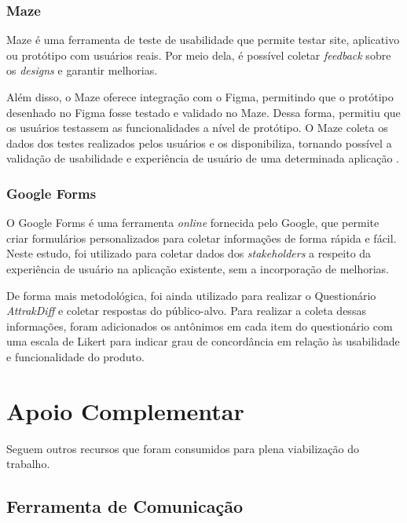 \subsubsection{Maze}
\label{sec:Maze}
Maze é uma ferramenta de teste de usabilidade que permite testar site, aplicativo ou protótipo com usuários reais. Por meio dela, é possível coletar \textit{feedback} sobre 
os \textit{designs} e garantir melhorias.

Além disso, o Maze oferece integração com o Figma, permitindo que o protótipo desenhado no Figma fosse testado e validado no Maze. Dessa forma, permitiu que os usuários 
testassem as funcionalidades a nível de protótipo. O Maze coleta os dados dos testes realizados pelos usuários e os disponibiliza, tornando possível a validação de usabilidade 
e experiência de usuário de uma determinada aplicação \cite{maze}.

\subsubsection{Google Forms}
\label{sec:Google Forms}
O Google Forms \cite{googleforms} é uma ferramenta \textit{online} fornecida pelo Google, que permite criar formulários personalizados para coletar informações de forma rápida e fácil. Neste estudo, foi 
utilizado para coletar dados dos \textit{stakeholders} a respeito da experiência de usuário na aplicação existente, sem a incorporação de melhorias.

De forma mais metodológica, foi ainda utilizado para realizar o Questionário \textit{AttrakDiff} e coletar respostas do público-alvo. Para realizar a coleta dessas informações, foram adicionados 
os antônimos em cada item do questionário com uma escala de Likert para indicar grau de concordância em relação às usabilidade e funcionalidade do produto.

\section{Apoio Complementar}
\label{sec:Apoio Complementar}
Seguem outros recursos que foram consumidos para plena viabilização do trabalho.

\subsection{Ferramenta de Comunicação}
\label{sec:Ferramenta de Comunicação}

